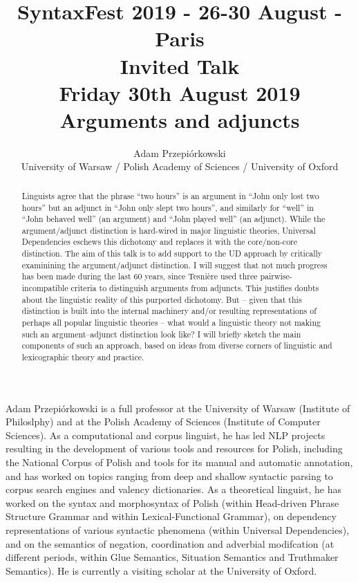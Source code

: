\documentclass[11pt]{article}
\title{{\footnotesize SyntaxFest 2019 - 26-30 August - Paris}\\
\vspace{10mm}
 Invited Talk\\
  {\small Friday 30th August 2019}\\
  Arguments and adjuncts}
\author{Adam Przepiórkowski\\
  University of Warsaw / Polish Academy of Sciences / University of Oxford}
\begin{document}
\maketitle
\begin{abstract}
Linguists agree that the phrase “two hours” is an argument in “John only lost two hours” but an adjunct in “John only slept two hours”, and similarly for “well” in “John behaved well” (an argument) and “John played well” (an adjunct). While the argument/adjunct distinction is hard-wired in major linguistic theories, Universal Dependencies eschews this dichotomy and replaces it with the core/non-core distinction. The aim of this talk is to add support to the UD approach by critically examinining the argument/adjunct distinction. I will suggest that not much progress has been made during the last 60 years, since Tesnière used three pairwise-incompatible criteria to distinguish arguments from adjuncts. This justifies doubts about the linguistic reality of this purported dichotomy. But – given that this distinction is built into the internal machinery and/or resulting representations of perhaps all popular linguistic theories – what would a linguistic theory not making such an argument–adjunct distinction look like? I will briefly sketch the main components of such an approach, based on ideas from diverse corners of linguistic and lexicographic theory and practice.
\end{abstract}

\vspace{4mm}
\begin{shortbio}
  Adam Przepiórkowski is a full professor at the University of Warsaw (Institute of Philoslphy) and at the Polish Academy of Sciences (Institute of Computer Sciences). As a computational and corpus linguist, he has led NLP projects resulting in the development of various tools and resources for Polish, including the National Corpus of Polish and tools for its manual and automatic annotation, and has worked on topics ranging from deep and shallow syntactic parsing to corpus search engines and valency dictionaries. As a theoretical linguist, he has worked on the syntax and morphosyntax of Polish (within Head-driven Phrase Structure Grammar and within Lexical-Functional Grammar), on dependency representations of various syntactic phenomena (within Universal Dependencies), and on the semantics of negation, coordination and adverbial modifcation (at different periods, within Glue Semantics, Situation Semantics and Truthmaker Semantics). He is currently a visiting scholar at the University of Oxford.
  
\end{shortbio}
\end{document}
